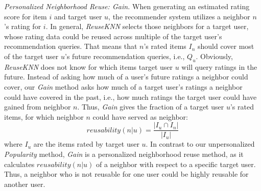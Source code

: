 \documentclass[manuscript,review,anonymous]{acmart}
\begin{document}
\vspace{2mm} \noindent \emph{Personalized Neighborhood Reuse: Gain.}
When generating an estimated rating score for item $i$ and target user $u$, the recommender system utilizes a neighbor $n$'s rating for $i$.
In general, \emph{ReuseKNN} selects those neighbors for a target user, whose rating data could be reused across multiple of the target user's recommendation queries.
That means that $n$'s rated items $I_n$ should cover most of the target user $u$'s future recommendation queries, i.e., $Q_u$.
Obviously, \emph{ReuseKNN} does not know for which items target user $u$ will query ratings in the future. 
Instead of asking how much of a user's future ratings a neighbor could cover, our \emph{Gain} method asks how much of a target user's ratings a neighbor could have covered in the past, i.e., how much ratings the target user could have gained from neighbor $n$.
Thus, \emph{Gain} gives the fraction of a target user $u$'s rated items, for which neighbor $n$ could have served as neighbor:
\begin{equation}
    reusability(n|u) = \frac{|I_u \cap I_n|}{|I_u|} \label{eq:gain}
\end{equation}
where $I_u$ are the items rated by target user $u$.
In contrast to our unpersonalized \emph{Popularity} method, \emph{Gain} is a personalized neighborhood reuse method, as it calculates $reusability(n|u)$ of a neighbor with respect to a specific target user.
Thus, a neighbor who is not reusable for one user could be highly reusable for another user.
\end{document}
